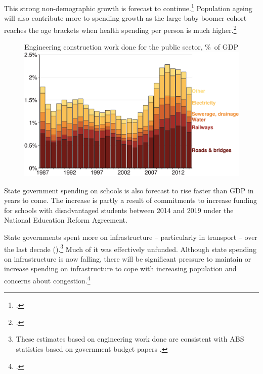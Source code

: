 \documentclass[twoside,english]{palatinob5portrait}
\begin{document}
This strong non-demographic growth is forecast to continue.\footcite{ProductivityCommission2013AgeingAustralia}  Population ageing will also contribute more to spending growth as the large baby boomer cohort reaches the age brackets when health spending per person is much higher.\footcite[][26]{DaleyWoodWeidmannEtAl2014}  

\begin{figure}[!t]
%
{Engineering construction work done for the public sector, \%\ of GDP}
\includegraphics[width=1.1\columnwidth]{Fiscal-challenges/figure/Figure14-1.pdf}

\end{figure}

State government spending on schools is also forecast to rise faster than GDP in years to come. The increase is partly a result of commitments to increase funding for schools with disadvantaged students between 2014 and 2019 under the National Education Reform Agreement.  

State governments spent more on infrastructure – particularly in transport – over the last decade ().\footnote{These estimates based on engineering work done are consistent with ABS statistics based on government budget papers \textcite[][41]{PBO2015a}.}  Much of it was effectively unfunded. Although state spending on infrastructure is now falling, there will be significant pressure to maintain or increase spending on infrastructure to cope with increasing population and concerns about congestion.\footcites[][112-128]{KellyDonegan2015}{InfrastructureAustralia2015-InfrastructureAudit}
\end{document}
